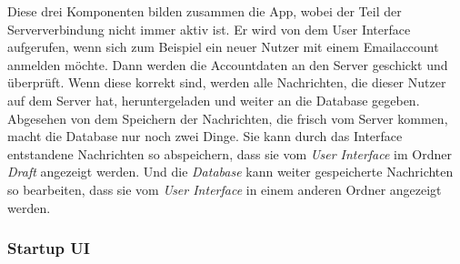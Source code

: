 \documentclass[a4paper,11pt]{article}
\begin{document}
\nohyphenation

Diese drei Komponenten bilden zusammen die App, wobei der Teil der Serververbindung nicht immer aktiv ist. Er wird von dem User Interface
aufgerufen, wenn sich zum Beispiel ein neuer Nutzer mit einem Emailaccount anmelden möchte. Dann werden die Accountdaten an den Server geschickt und überprüft.
Wenn diese korrekt sind, werden alle Nachrichten, die dieser Nutzer auf dem Server hat, heruntergeladen und weiter an die Database gegeben. Abgesehen von dem 
Speichern der Nachrichten, die frisch vom Server kommen, macht die Database nur noch zwei Dinge. Sie kann durch das Interface entstandene Nachrichten so abspeichern, dass sie 
vom \textit{User Interface} im Ordner \textit{Draft} angezeigt werden. Und die \textit{Database} kann weiter gespeicherte Nachrichten so bearbeiten, dass sie vom 
\textit{User Interface} in einem anderen Ordner angezeigt werden.

\endgroup

\subsubsection{Startup UI}


\end{document}
